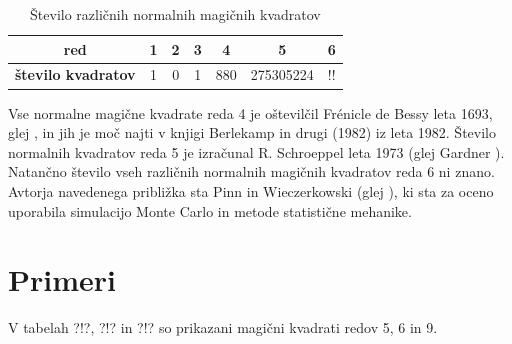\documentclass[a4paper,12pt]{article}
\begin{document}
\begin{table}[h]
   \centering
   \caption{Število različnih normalnih magičnih kvadratov}
   \label{table:stevila}
   \begin{tabular}{|c|c|c|c|c|c|c|}
       \hline
       \textbf{red} & 1 & 2 & 3 & 4 & 5 & 6 \\
       \hline
       \textbf{število kvadratov} & 1 & 0 & 1 & 880 & 275305224 & !! \\
       \hline
   \end{tabular}
\end{table}



Vse normalne magične kvadrate reda 4 je oštevilčil Frénicle de Bessy
leta 1693, glej \cite{bessy}, in jih je moč najti v knjigi Berlekamp in drugi (1982) \cite{berlekamp}
iz leta 1982. Število normalnih kvadratov reda 5 je izračunal
R. Schroeppel leta 1973 (glej Gardner \cite{gardner}).
Natančno število vseh različnih normalnih magičnih kvadratov reda 6 ni znano.
Avtorja navedenega približka sta Pinn in Wieczerkowski (glej \cite{pinn}), ki
sta za oceno uporabila simulacijo Monte Carlo in metode statistične mehanike.


\section{Primeri}

V tabelah ?!?, ?!? in ?!? so prikazani
magični kvadrati redov 5, 6 in 9.


\end{document}
